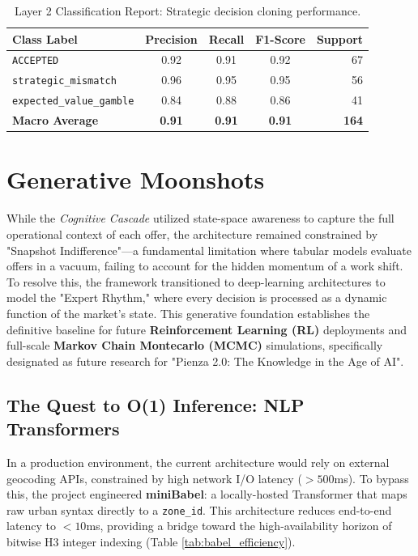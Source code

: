 \documentclass[10pt, letterpaper]{article}
\begin{document}
\begin{table}[H]
    \centering
    \small
    \begin{tabular}{l c c c r}
        \toprule
        \textbf{Class Label} & \textbf{Precision} & \textbf{Recall} & \textbf{F1-Score} & \textbf{Support} \\
        \midrule
        \texttt{ACCEPTED}               & 0.92 & 0.91 & 0.92 & 67 \\ \addlinespace[2pt]
        \texttt{strategic\_mismatch}    & 0.96 & 0.95 & 0.95 & 56 \\ \addlinespace[2pt]
        \texttt{expected\_value\_gamble}& 0.84 & 0.88 & 0.86 & 41 \\ \addlinespace[4pt]
        \midrule
        \textbf{Macro Average}          & \textbf{0.91} & \textbf{0.91} & \textbf{0.91} & \textbf{164} \\
        \bottomrule
    \end{tabular}
    \caption{Layer 2 Classification Report: Strategic decision cloning performance.}
    \label{tab:layer2_report}
\end{table}


\section{Generative Moonshots}

While the \textit{Cognitive Cascade} utilized state-space awareness to capture the full operational context of each offer, the architecture remained constrained by "Snapshot Indifference"—a fundamental limitation where tabular models evaluate offers in a vacuum, failing to account for the hidden momentum of a work shift. To resolve this, the framework transitioned to deep-learning architectures to model the "Expert Rhythm," where every decision is processed as a dynamic function of the market’s state. This generative foundation establishes the definitive baseline for future \textbf{Reinforcement Learning (RL)} deployments and full-scale \textbf{Markov Chain Montecarlo (MCMC)} simulations, specifically designated as future research for "Pienza 2.0: The Knowledge in the Age of AI".

\subsection{The Quest to O(1) Inference: NLP Transformers}
In a production environment, the current architecture would rely on external geocoding APIs, constrained by high network I/O latency ($>500$ms). To bypass this, the project engineered \textbf{miniBabel}: a locally-hosted Transformer that maps raw urban syntax directly to a \texttt{zone\_id}. This architecture reduces end-to-end latency to $<10$ms, providing a bridge toward the high-availability horizon of bitwise H3 integer indexing (Table \ref{tab:babel_efficiency}).
\end{document}
